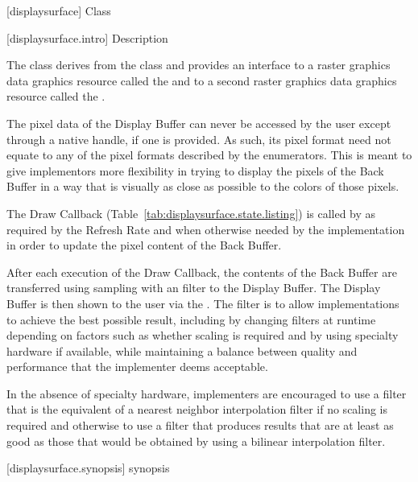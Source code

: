  [displaysurface] {Class }

 [displaysurface.intro] { Description}

\pnum
{}
The class  derives from the  class and provides an interface to a raster graphics data graphics resource called the  and to a second raster graphics data graphics resource called the .

\pnum
The pixel data of the Display Buffer can never be accessed by the user except through a native handle, if one is provided. As such, its pixel format need not equate to any of the pixel formats described by the  enumerators. This is meant to give implementors more flexibility in trying to display the pixels of the Back Buffer in a way that is visually as close as possible to the colors of those pixels.

\pnum
The Draw Callback (Table~\ref{tab:displaysurface.state.listing}) is called by  as required by the Refresh Rate and when otherwise needed by the implementation in order to update the pixel content of the Back Buffer.

\pnum
After each execution of the Draw Callback, the contents of the Back Buffer are transferred using sampling with an \unspecnorm filter to the Display Buffer. The Display Buffer is then shown to the user via the .
\enternote
The filter is \unspecnorm to allow implementations to achieve the best possible result, including by changing filters at runtime depending on factors such as whether scaling is required and by using specialty hardware if available, while maintaining a balance between quality and performance that the implementer deems acceptable.

In the absence of specialty hardware, implementers are encouraged to use a filter that is the equivalent of a nearest neighbor interpolation filter if no scaling is required and otherwise to use a filter that produces results that are at least as good as those that would be obtained by using a bilinear interpolation filter.
\exitnote

 [displaysurface.synopsis] { synopsis}

